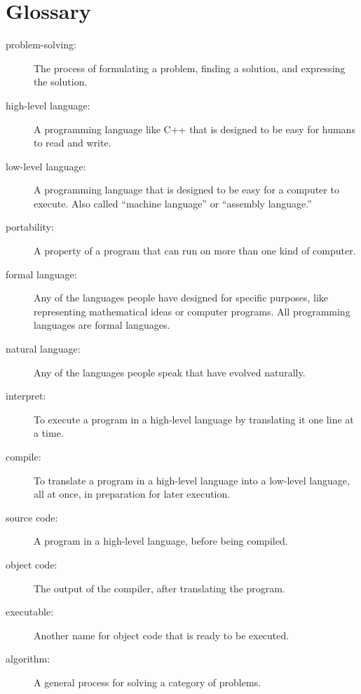 \section{Glossary}

\begin{description}

\item[problem-solving:]  The process of formulating a problem, finding
a solution, and expressing the solution.

\item[high-level language:]  A programming language like C++ that
is designed to be easy for humans to read and write.

\item[low-level language:]  A programming language that is designed
to be easy for a computer to execute.  Also called ``machine
language'' or ``assembly language.''

\item[portability:]  A property of a program that can run on more
than one kind of computer.

\item[formal language:]  Any of the languages people have designed
for specific purposes, like representing mathematical ideas or
computer programs.  All programming languages are formal languages.

\item[natural language:]  Any of the languages people speak that
have evolved naturally.

\item[interpret:]  To execute a program in a high-level language
by translating it one line at a time.

\item[compile:]  To translate a program in a high-level language
into a low-level language, all at once, in preparation for later
execution.

\item[source code:]  A program in a high-level language, before
being compiled.

\item[object code:]  The output of the compiler, after translating
the program.

\item[executable:]  Another name for object code that is ready
to be executed.

\item[algorithm:]  A general process for solving a category of
problems. 


\end{description}
